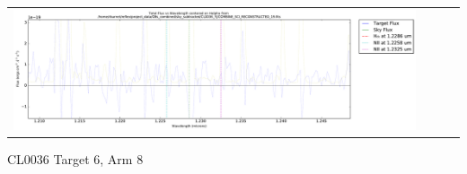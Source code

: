 \documentclass[10pt,letterpaper]{article}
\begin{document}
\begin{table}[h!]
\begin{center}
\begin{tabular}{ >{\centering\arraybackslash}m{2.5in} >{\centering\arraybackslash}m{2.5in} >{\centering\arraybackslash}m{2.5in} >{\centering\arraybackslash}m{2.3in}}
\includegraphics[scale=0.45]{../figures/CL0036_YJ/COMBINE_SCI_RECONSTRUCTED_19_Halpha.pdf}
\end{tabular}
\end{center}
\end{table}

\newpage 

CL0036 Target 6, Arm 8 \\
\end{document}
